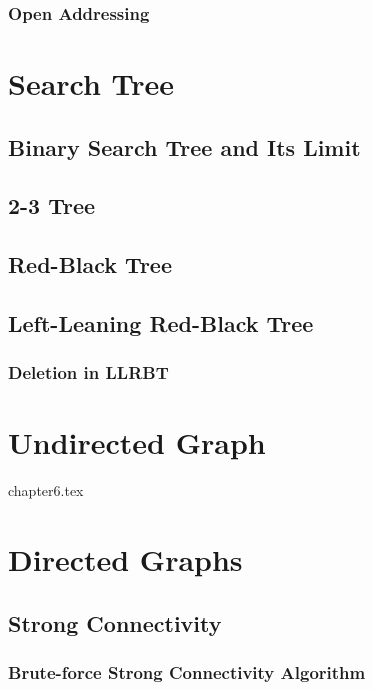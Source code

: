 \documentclass{report}
\begin{document}
\subsection{Open Addressing}


\chapter{Search Tree}

\section{Binary Search Tree and Its Limit}

\section{2-3 Tree}

\section{Red-Black Tree}

\section{Left-Leaning Red-Black Tree}

\subsection{Deletion in LLRBT}


\chapter{Undirected Graph}

{chapter6.tex}


\chapter{Directed Graphs}

\section{Strong Connectivity}

\subsection{Brute-force Strong Connectivity Algorithm}
\end{document}
